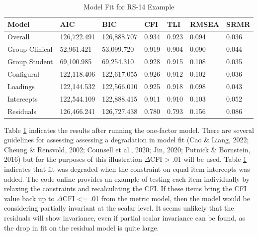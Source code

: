 \documentclass[
  man]{apa7}
\begin{document}
\begin{table}[tbp]

\begin{center}
\begin{threeparttable}

\caption{\label{tab:rs-table}Model Fit for RS-14 Example}

\begin{tabular}{lllllll}
\toprule
Model & AIC & BIC & CFI & TLI & RMSEA & SRMR\\
\midrule
Overall & 126,722.491 & 126,888.707 & 0.934 & 0.923 & 0.094 & 0.036\\
Group Clinical & 52,961.421 & 53,099.720 & 0.919 & 0.904 & 0.090 & 0.044\\
Group Student & 69,100.985 & 69,254.310 & 0.928 & 0.915 & 0.108 & 0.035\\
Configural & 122,118.406 & 122,617.055 & 0.926 & 0.912 & 0.102 & 0.036\\
Loadings & 122,144.532 & 122,566.010 & 0.925 & 0.918 & 0.098 & 0.043\\
Intercepts & 122,544.109 & 122,888.415 & 0.911 & 0.910 & 0.103 & 0.052\\
Residuals & 126,466.241 & 126,727.438 & 0.780 & 0.793 & 0.156 & 0.086\\
\bottomrule
\end{tabular}

\end{threeparttable}
\end{center}

\end{table}

Table \ref{tab:rs-table} indicates the results after running the one-factor model. There are several guidelines for assessing assessing a degradation in model fit (Cao \& Liang, 2022; Cheung \& Rensvold, 2002; Counsell et al., 2020; Jin, 2020; Putnick \& Bornstein, 2016) but for the purposes of this illustration \(\Delta\)CFI \textgreater{} .01 will be used. Table \ref{tab:rs-table} indicates that fit was degraded when the constraint on equal item intercepts was added. The code online provides an example of testing each item individually by relaxing the constraints and recalculating the CFI. If these items bring the CFI value back up to \(\Delta\)CFI \textless= .01 from the metric model, then the model would be considering partially invariant at the scalar level. It seems unlikely that the residuals will show invariance, even if partial scalar invariance can be found, as the drop in fit on the residual model is quite large.
\end{document}
